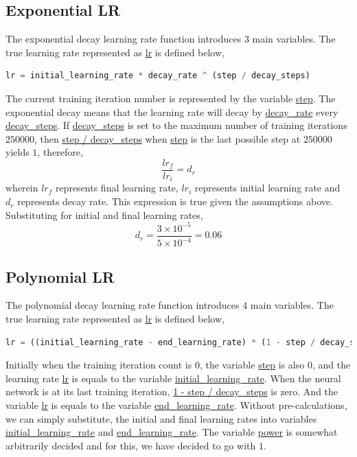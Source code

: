 \documentclass[a4paper, 12pt]{report}
\begin{document}
\begin{center}
\subsection{Exponential LR}

The exponential decay learning rate function introduces $3$ main variables. The true learning rate represented as \url{lr} is defined below,
\begin{lstlisting}[language=python]
lr = initial_learning_rate * decay_rate ^ (step / decay_steps)
\end{lstlisting}
The current training iteration number is represented by the variable \url{step}. The exponential decay means that the learning rate will decay by \url{decay_rate} every \url{decay_steps}. If \url{decay_steps} is set to the maximum number of training iterations $250000$, then \url{step / decay_steps} when \url{step} is the last possible step at  $250000$ yields $1$, therefore,
$$\frac{lr_{f}}{lr_{i}} = d_{r}$$
wherein $lr_{f}$ represents final learning rate, $lr_{i}$ represents initial learning rate and $d_{r}$ represents decay rate. This expression is true given the assumptions above. Substituting for initial and final learning rates,
$$d_{r} = \frac{3\times10^{-5}}{5\times10^{-4}} = 0.06$$
\subsection{Polynomial LR}

The polynomial decay learning rate function introduces $4$ main variables. The true learning rate represented as \url{lr} is defined below,
\begin{lstlisting}[language=python]
lr = ((initial_learning_rate - end_learning_rate) * (1 - step / decay_steps) ^ (power)) + end_learning_rate
\end{lstlisting}
Initially when the training iteration count is $0$, the variable \url{step} is also $0$, and the learning rate \url{lr} is equals to the variable \url{initial_learning_rate}. When the neural network is at its last training iteration, \url{1 - step / decay_steps} is zero. And the variable \url{lr} is equals to the variable \url{end_learning_rate}. Without pre-calculations, we can simply substitute, the initial and final learning rates into variables \url{initial_learning_rate} and \url{end_learning_rate}. The variable \url{power} is somewhat arbitrarily decided and for this, we have decided to go with $1$.

\end{center}
\end{document}
